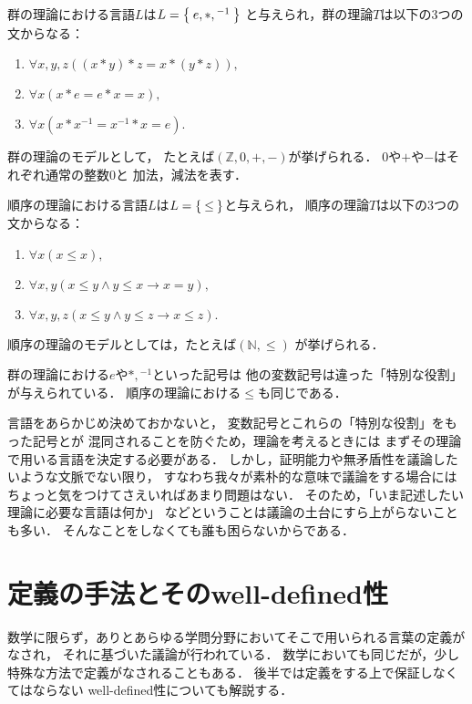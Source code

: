   \begin{ex}[群の理論]
    群の理論における言語$L$は$L= \Set{ e, \ast , {}^{-1} }$
    と与えられ，群の理論$T$は以下の3つの文からなる：
    \begin{enumerate}[G1. ]
      \item $\forall x,y,z ((x \ast y) \ast z = x \ast (y \ast z ) ),$ 
      \item $\forall x ( x \ast e = e \ast x = x ) , $
      \item $ \forall x ( x \ast x^{-1} = x^{-1} \ast x = e ).$
    \end{enumerate}
    群の理論のモデルとして，
    たとえば$(\mathbb{Z} , 0, +, -)$が挙げられる．
    $0$や$+$や$-$はそれぞれ通常の整数$0$と
    加法，減法を表す．
  \end{ex}


  \begin{ex}[順序の理論]
    順序の理論における言語$L$は$L= \Set{ \leq }$と与えられ，
    順序の理論$T$は以下の3つの文からなる：
    \begin{enumerate}[O1. ]
      \item $\forall x (x \leq x) ,$
      \item $\forall x,y ({x \leq y} \land { y \leq x } \to x = y) ,$
      \item $\forall x,y,z ({x \leq y } \land {y \leq z} \to x \leq z).$
    \end{enumerate}
    順序の理論のモデルとしては，たとえば$( \mathbb{N} , {\leq})$
    が挙げられる．
  \end{ex}

  群の理論における$e$や${\ast},{}^{-1} $といった記号は
  他の変数記号は違った「特別な役割」が与えられている．
  順序の理論における$\leq$も同じである．
  
  言語をあらかじめ決めておかないと，
  変数記号とこれらの「特別な役割」をもった記号とが
  混同されることを防ぐため，理論を考えるときには
  まずその理論で用いる言語を決定する必要がある．
  しかし，証明能力や無矛盾性を議論したいような文脈でない限り，
  すなわち我々が素朴的な意味で議論をする場合には
  ちょっと気をつけてさえいればあまり問題はない．
  そのため，「いま記述したい理論に必要な言語は何か」
  などということは議論の土台にすら上がらないことも多い．
  そんなことをしなくても誰も困らないからである．


  

  


  




 \section{定義の手法とそのwell-defined性}
 \label{sec:welldef}
  数学に限らず，ありとあらゆる学問分野においてそこで用いられる言葉の定義がなされ，
  それに基づいた議論が行われている．
  数学においても同じだが，少し特殊な方法で定義がなされることもある．
  後半では定義をする上で保証しなくてはならない
  well-defined性についても解説する．

